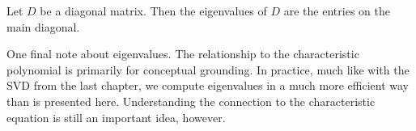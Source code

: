 \documentclass{ximera}
\begin{document}
    
\begin{corollary}\label{th:eigdiag}
Let $D$ be a diagonal matrix.  Then the eigenvalues of $D$ are the entries on the main diagonal.
\end{corollary}
    
\begin{remark}
    One final note about eigenvalues. The relationship to the characteristic polynomial is primarily for conceptual grounding. In practice, much like with the SVD from the last chapter, we compute eigenvalues in a much more efficient way than is presented here. Understanding the connection to the characteristic equation is still an important idea, however.
\end{remark}
\end{document}
